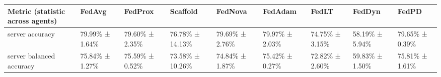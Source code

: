 \begin{tabular}{lllllllll}
\hline
 Metric (statistic across agents)   & FedAvg         & FedProx        & Scaffold        & FedNova        & FedAdam        & FedLT          & FedDyn         & FedPD          \\
\hline
 server accuracy                    & 79.99\% ± 1.64\% & 79.60\% ± 2.35\% & 76.78\% ± 14.13\% & 79.69\% ± 2.76\% & 79.97\% ± 2.03\% & 74.75\% ± 3.15\% & 58.19\% ± 5.94\% & 79.65\% ± 0.39\% \\
 server balanced accuracy           & 75.84\% ± 1.27\% & 75.59\% ± 0.52\% & 73.58\% ± 10.26\% & 74.84\% ± 1.87\% & 75.42\% ± 0.27\% & 72.82\% ± 2.60\% & 59.83\% ± 1.50\% & 75.81\% ± 1.61\% \\
\hline
\end{tabular}